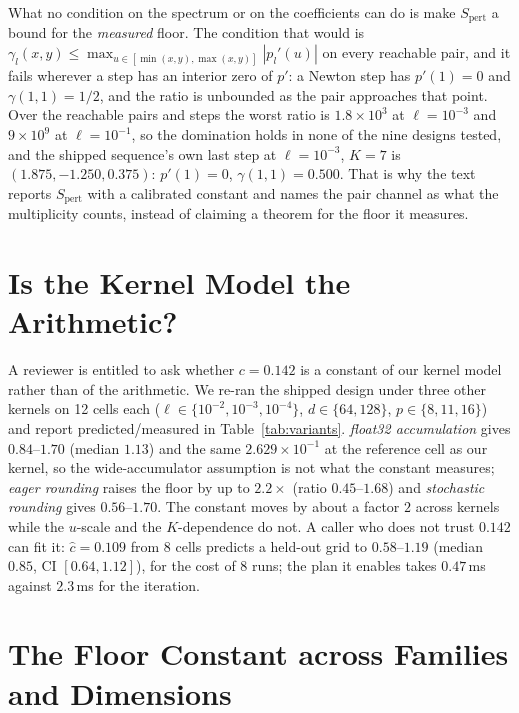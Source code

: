 What no condition on the spectrum or on the coefficients can do is make
$S_{\mathrm{pert}}$ a bound for the \emph{measured} floor.  The condition that would is
$\gamma_l(x,y)\le\max_{u\in[\min(x,y),\max(x,y)]}|p_l'(u)|$ on every reachable pair, and it
fails wherever a step has an interior zero of $p'$: a Newton step has $p'(1)=0$ and
$\gamma(1,1)=1/2$, and the ratio is unbounded as the pair approaches that point.  Over the
reachable pairs and steps the worst ratio is $1.8\times10^3$ at $\ell=10^{-3}$ and
$9\times10^9$ at $\ell=10^{-1}$, so the domination holds in none of the nine designs
tested, and the shipped sequence's own last step at $\ell=10^{-3}$, $K=7$ is
$(1.875,-1.250,0.375)$: $p'(1)=0$, $\gamma(1,1)=0.500$.  That is why the text reports
$S_{\mathrm{pert}}$ with a calibrated constant and names the pair channel as what the
multiplicity counts, instead of claiming a theorem for the floor it measures.

\section{Is the Kernel Model the Arithmetic?}
\label{sec:variants}

A reviewer is entitled to ask whether $c=0.142$ is a constant of our kernel model rather
than of the arithmetic.  We re-ran the shipped design under three other kernels on 12
cells each ($\ell\in\{10^{-2},10^{-3},10^{-4}\}$, $d\in\{64,128\}$, $p\in\{8,11,16\}$)
and report predicted/measured in Table~\ref{tab:variants}.  \emph{float32 accumulation}
gives $0.84$--$1.70$ (median $1.13$) and the same $2.629\times10^{-1}$ at the reference
cell as our kernel, so the wide-accumulator assumption is not what the constant measures;
\emph{eager rounding} raises the floor by up to $2.2\times$ (ratio $0.45$--$1.68$) and
\emph{stochastic rounding} gives $0.56$--$1.70$.  The constant moves by about a factor $2$
across kernels while the $u$-scale and the $K$-dependence do not.  A caller who does not
trust $0.142$ can fit it: $\hat c=0.109$ from 8 cells predicts a held-out grid to
$0.58$--$1.19$ (median $0.85$, CI $[0.64,1.12]$), for the cost of 8 runs; the plan it
enables takes $0.47$\,ms against $2.3$\,ms for the iteration.

\section{The Floor Constant across Families and Dimensions}
\label{app:constant}

